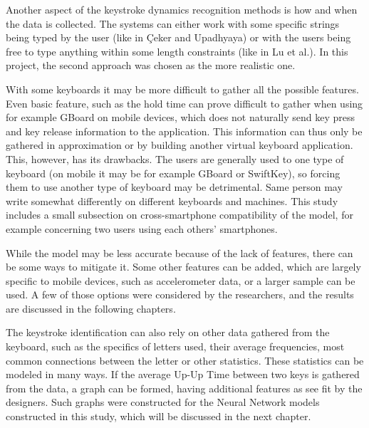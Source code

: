 Another aspect of the keystroke dynamics recognition methods is how and when the data is collected. The systems can either work with some specific strings being typed by the user (like in Çeker and Upadhyaya) or with the users being free to type anything within some length constraints (like in Lu et al.). In this project, the second approach was chosen as the more realistic one.

With some keyboards it may be more difficult to gather all the possible features. Even basic feature, such as the hold time can prove difficult to gather when using for example GBoard on mobile devices, which does not naturally send key press and key release information to the application. \cite{android_keyboard_commands_2025} This information can thus only be gathered in approximation or by building another virtual keyboard application. This, however, has its drawbacks. The users are generally used to one type of keyboard (on mobile it may be for example GBoard or SwiftKey), so forcing them to use another type of keyboard may be detrimental. Same person may write somewhat differently on different keyboards and machines. This study includes a small subsection on cross-smartphone compatibility of the model, for example concerning two users using each others' smartphones.

While the model may be less accurate because of the lack of features, there can be some ways to mitigate it. Some other features can be added, which are largely specific to mobile devices, such as accelerometer data, or a larger sample can be used. A few of those options were considered by the researchers, and the results are discussed in the following chapters.

The keystroke identification can also rely on other data gathered from the keyboard, such as the specifics of letters used, their average frequencies, most common connections between the letter or other statistics. \cite{Wang2024} These statistics can be modeled in many ways. If the average Up-Up Time between two keys is gathered from the data, a graph can be formed, having additional features as see fit by the designers. Such graphs were constructed for the Neural Network models constructed in this study, which will be discussed in the next chapter.